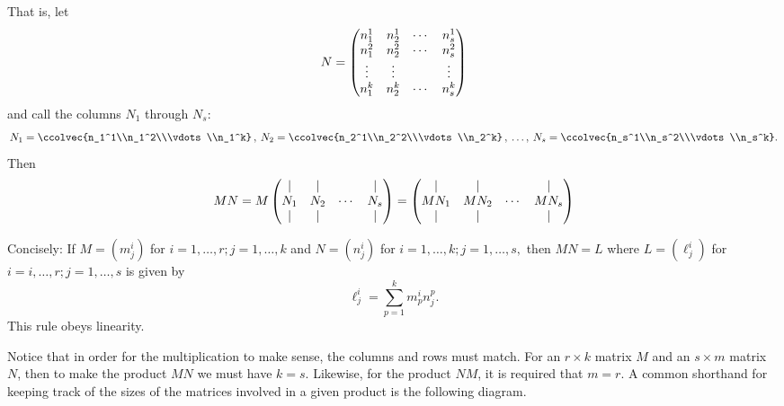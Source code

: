 That is, let \[N = 
\begin{pmatrix}
n_1^1 & n_2^1 & \cdots & n_s^1 \\
n_1^2 & n_2^2 & \cdots & n_s^2 \\
\multicolumn{1}{c}{\vdots} & \multicolumn{1}{c}{\vdots} &   & \multicolumn{1}{c}{\vdots} \\
n_1^k & n_2^k & \cdots & n_s^k \\
\end{pmatrix}
\]
and call the columns \(N_1\) through \(N_s\):
\[N_1 = \ccolvec{n_1^1\\n_1^2\\\vdots\\n_1^k}\, ,\:
N_2 = \ccolvec{n_2^1\\n_2^2\\\vdots\\n_2^k}\, ,\:
\ldots,\:
N_s = \ccolvec{n_s^1\\n_s^2\\\vdots\\n_s^k}.
\]
Then
\[
MN=M
\begin{pmatrix}
\multicolumn{1}{c}{|} & \multicolumn{1}{c}{|} & & \multicolumn{1}{c}{|} \\
N_1 & N_2 & \cdots & N_s \\
\multicolumn{1}{c}{|} & \multicolumn{1}{c}{|} & & \multicolumn{1}{c}{|} \\
\end{pmatrix}
=
\begin{pmatrix}
\multicolumn{1}{c}{|} & \multicolumn{1}{c}{|} & & \multicolumn{1}{c}{|} \\
MN_1 & MN_2 & \cdots & MN_s \\
\multicolumn{1}{c}{|} & \multicolumn{1}{c}{|} & & \multicolumn{1}{c}{|} \\
\end{pmatrix}
\]

Concisely: If \(M=(m^i_j)\) for \(i=1, \ldots, r; j=1, \ldots, k\) and \(N=(n^i_j)\) for \(i=1, \ldots, k; j=1, \ldots, s,\) then \(MN=L\) where \(L=(\ell^i_j)\) for \(i=i, \ldots, r; j=1, \ldots, s\) is given by
\[
\ell^i_j = \sum_{p=1}^k m^i_p n^p_j.
\]
This rule obeys linearity.

Notice that in order for the multiplication to make sense, the columns and rows must match.  For an $r\times k$ matrix $M$ and an $s\times m$ matrix $N$, then to make the product $MN$ we must have $k=s$.  Likewise, for the product $NM$, it is required that $m=r$.  A common shorthand for keeping track of the sizes of the matrices involved in a given product is the following diagram.

